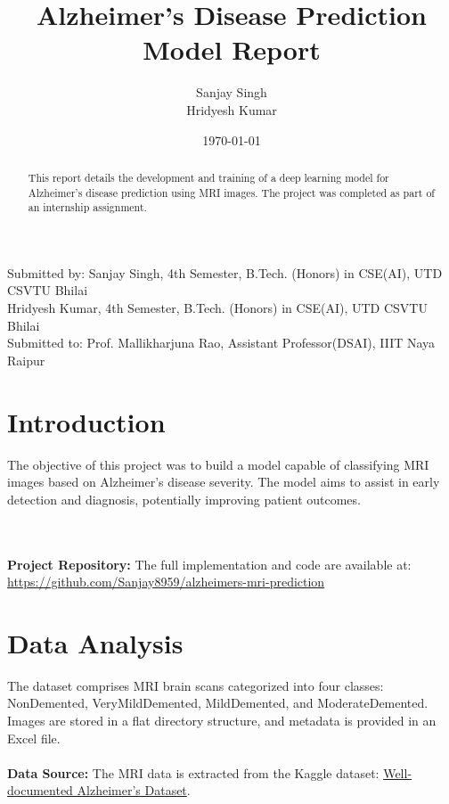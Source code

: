 \documentclass{article}
\title{Alzheimer's Disease Prediction Model Report}
\author{Sanjay Singh \\ Hridyesh Kumar}
\date{\today}
\begin{document}
\maketitle

\begin{center}
Submitted by: Sanjay Singh, 4th Semester, B.Tech. (Honors) in CSE(AI), UTD CSVTU Bhilai \\
Hridyesh Kumar, 4th Semester, B.Tech. (Honors) in CSE(AI), UTD CSVTU Bhilai \\
Submitted to: Prof. Mallikharjuna Rao, Assistant Professor(DSAI), IIIT Naya Raipur
\end{center}

\begin{abstract}
This report details the development and training of a deep learning model for Alzheimer's disease prediction using MRI images. The project was completed as part of an internship assignment.
\end{abstract}

\section{Introduction}
The objective of this project was to build a model capable of classifying MRI images based on Alzheimer's disease severity. The model aims to assist in early detection and diagnosis, potentially improving patient outcomes.

\\
\\
\textbf{Project Repository:} The full implementation and code are available at: 
\href{https://github.com/Sanjay8959/alzheimers-mri-prediction}{https://github.com/Sanjay8959/alzheimers-mri-prediction}

\section{Data Analysis}
The dataset comprises MRI brain scans categorized into four classes: NonDemented, VeryMildDemented, MildDemented, and ModerateDemented. Images are stored in a flat directory structure, and metadata is provided in an Excel file.\\
\\
\textbf{Data Source:} The MRI data is extracted from the Kaggle dataset: \href{https://www.kaggle.com/datasets/yiweilu2033/well-documented-alzheimers-dataset}{Well-documented Alzheimer's Dataset}.
\end{document}
